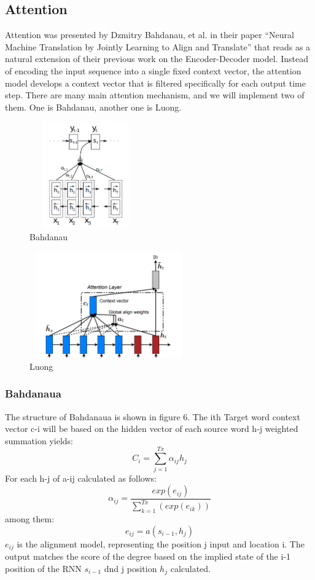 \documentclass[sigconf]{acmart}
\begin{document}
\subsection{Attention}
Attention was presented by Dzmitry Bahdanau, et al. in their paper “Neural Machine Translation by Jointly Learning to Align and Translate” that reads as a natural extension of their previous work on the Encoder-Decoder model. Instead of encoding the input sequence into a single fixed context vector, the attention model develops a context vector that is filtered specifically for each output time step. There are many main attention mechanism, and we will implement two of them. One is Bahdanau, another one is Luong.
\begin{figure}
    \centering
    \includegraphics[width = 1.9in, height = 1.8in]{bahda.png}
    \caption{Bahdanau}
    \label{fig:6}
\end{figure}

\begin{figure}
    \centering
    \includegraphics[width = 2.7in, height = 1.8in]{luong.png}
    \caption{Luong}
    \label{fig:7}
\end{figure}
\subsubsection{Bahdanaua}

The structure of Bahdanaua is shown in figure 6. The ith Target word context vector c-i will be based on the hidden vector of each source word h-j weighted summation yields: $$C_i=\sum_{j=1}^{Tx}\alpha_{ij}h_{j}$$
For each h-j of a-ij calculated as follows:
$$\alpha_{ij} = \frac{exp(e_{ij})}{\sum_{k=1}^{Tx}(exp(e_{ik}))}$$
among them:
$$e_{ij} = a(s_{i-1},h_j)$$
$e_{ij}$ is the alignment model, representing the position j input and location i. The output matches the score of the degree based on the implied state of the i-1 position of the RNN $s_{i-1}$ dnd j position $h_{j}$ calculated.
\end{document}
